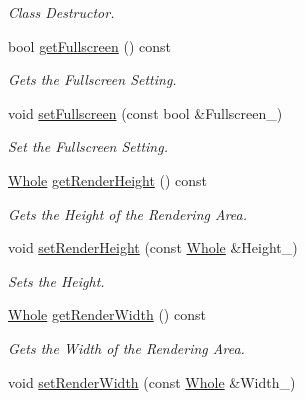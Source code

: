 \begin{DoxyCompactItemize}
\begin{DoxyCompactList}\small\item\em Class Destructor. \item\end{DoxyCompactList}\item 
bool \hyperlink{classphys_1_1GraphicsManager_ad126eedb81e3f0304731ddd33b617593}{getFullscreen} () const 
\begin{DoxyCompactList}\small\item\em Gets the Fullscreen Setting. \item\end{DoxyCompactList}\item 
void \hyperlink{classphys_1_1GraphicsManager_aafcf1824190e44d42a9bfbea9cfbe1b2}{setFullscreen} (const bool \&Fullscreen\_\-)
\begin{DoxyCompactList}\small\item\em Set the Fullscreen Setting. \item\end{DoxyCompactList}\item 
\hyperlink{namespacephys_a460f6bc24c8dd347b05e0366ae34f34a}{Whole} \hyperlink{classphys_1_1GraphicsManager_a38ee0f8a8a7d8ba861b1c6cfe579443e}{getRenderHeight} () const 
\begin{DoxyCompactList}\small\item\em Gets the Height of the Rendering Area. \item\end{DoxyCompactList}\item 
void \hyperlink{classphys_1_1GraphicsManager_a8d59e9a8aa2ae7f520d388a4c70f0623}{setRenderHeight} (const \hyperlink{namespacephys_a460f6bc24c8dd347b05e0366ae34f34a}{Whole} \&Height\_\-)
\begin{DoxyCompactList}\small\item\em Sets the Height. \item\end{DoxyCompactList}\item 
\hyperlink{namespacephys_a460f6bc24c8dd347b05e0366ae34f34a}{Whole} \hyperlink{classphys_1_1GraphicsManager_a9e1ce1f9f8bcff7712fd5beaf7cf2337}{getRenderWidth} () const 
\begin{DoxyCompactList}\small\item\em Gets the Width of the Rendering Area. \item\end{DoxyCompactList}\item 
void \hyperlink{classphys_1_1GraphicsManager_aea5fb5808a23fa29c8522c396ac0d6b5}{setRenderWidth} (const \hyperlink{namespacephys_a460f6bc24c8dd347b05e0366ae34f34a}{Whole} \&Width\_\-)

\end{DoxyCompactItemize}
